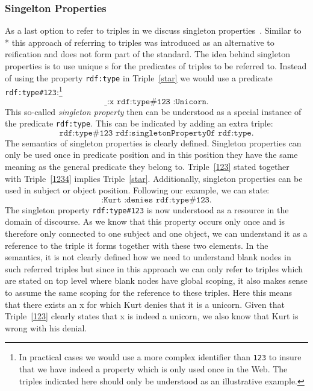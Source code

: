 \subsubsection{Singelton Properties}
As a last option to refer to triples in \rdf we discuss singleton properties~\cite{singleton}. Similar to \rdf{}* this approach of referring to triples was 
introduced as an alternative to \rdf reification and does not form part of the standard. The idea behind singleton properties is to use unique \uri{}s for the predicates of triples 
to be referred to. %
Instead of using the property \texttt{rdf:type} in Triple~\ref{star} we would use a predicate \texttt{rdf:type\#123}:\footnote{In practical cases we would use a more complex identifier than \texttt{123}
to insure that we have indeed a property which is only used once in the Web. The triples indicated here should only be understood as an illustrative example.}
\begin{equation}\label{123}
 \texttt{\_:x rdf:type\#123 :Unicorn.} 
\end{equation}
This so-called \emph{singleton property} then 
can be understood as a special instance of the predicate \texttt{rdf:type}. This can be indicated by adding an extra triple:
\begin{equation}\label{1234}
 \texttt{rdf:type\#123 rdf:singletonPropertyOf rdf:type.}
\end{equation}
The semantics of singleton properties is clearly defined. Singleton properties can only be used once in predicate position and in this position they have the same meaning as
the general predicate they belong to. 
Triple~\ref{123} stated together with Triple~\ref{1234} implies Triple~\ref{star}. 
Additionally, singleton properties can be used in subject or object position. Following our example, we can state:
\begin{equation}
 \texttt{:Kurt :denies rdf:type\#123.}
\end{equation}
The singleton property \texttt{rdf:type\#123} is now understood as a resource in the domain of 
discourse. As we know that this property  occurs only once and is therefore only connected to one subject and one object, we can understand it as a reference to the triple 
it forms together with these two elements. In the semantics, it is not clearly defined how we need to understand blank nodes in such referred triples but since in this approach we can only 
refer to triples which are stated on top level where blank nodes have global scoping, it also makes sense to assume the same scoping for the reference to these triples. Here this means that there exists 
an x for which Kurt denies that it is a unicorn. Given that Triple~\ref{123} clearly states that x is indeed a unicorn, we also know that Kurt is wrong with his denial.

